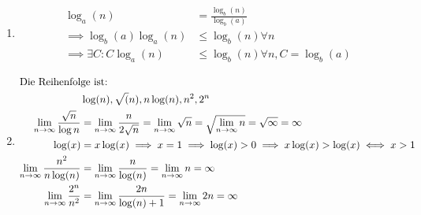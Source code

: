\documentclass[a4paper]{scrartcl}
\DeclareMathOperator{\Exists}{\exists}%
\DeclareMathOperator{\Forall}{\forall}%
\begin{document}
\begin{enumerate}
\item \begin{align*}
\log_a(n) &= \frac{\log_b(n)}{\log_b(a)} \\
\implies \log_b(a) \log_a(n) &\leq \log_b(n) \Forall n \\
\implies \Exists C: C\log_a(n) &\leq \log_b(n) \Forall n, C = \log_b(a)
\end{align*}
\item \begin{align*}
\intertext{Die Reihenfolge ist:}
&\log(n), \sqrt(n), n\log(n), n^2, 2^n \\
\lim_{n\to\infty} \frac{\sqrt{n}}{\log{n}} &= \lim_{n\to\infty} \frac{n}{2\sqrt{n}} = \lim_{n\to\infty} \sqrt{n} = \sqrt{\lim_{n\to\infty} n} = \sqrt{\infty} = \infty \\
\log(x) &= x \log(x) \implies x = 1 \implies \log(x) > 0 \implies x\log(x) > \log(x) \iff x > 1 \\
\lim_{n\to\infty} \frac{n^2}{n\log(n)} &= \lim_{n\to\infty} \frac{n}{\log(n)} = \lim_{n\to\infty} n = \infty \\
\lim_{n\to\infty} \frac{2^n}{n^2} &= \lim_{n\to\infty} \frac{2n}{\log(n) + 1} = \lim_{n\to\infty} 2n = \infty \\
\end{align*}
\end{enumerate}
\end{document}
